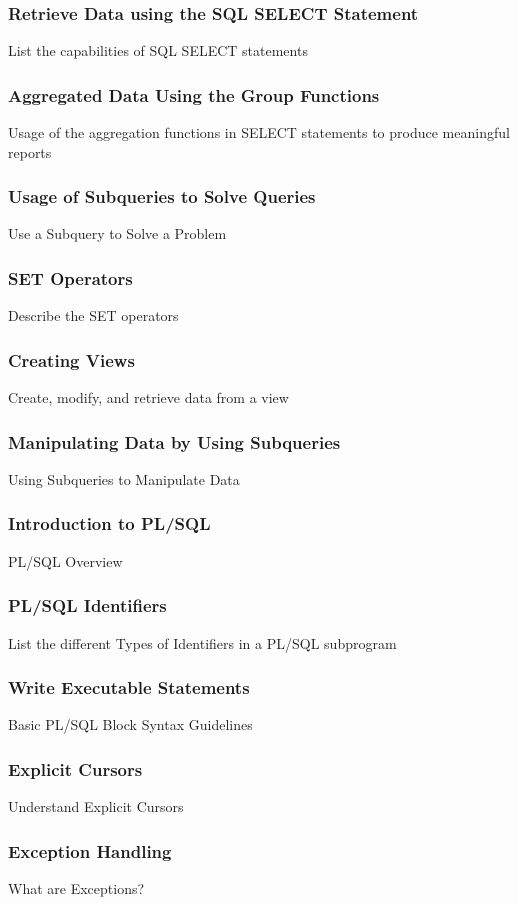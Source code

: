 \documentclass[twocolumn]{article}
\begin{document}
    \subsubsection*{Retrieve Data using the SQL SELECT Statement}
    List the capabilities of SQL SELECT statements
    \subsubsection*{Aggregated Data Using the Group Functions}
    Usage of the aggregation functions in SELECT statements to produce meaningful reports
    \subsubsection*{Usage of Subqueries to Solve Queries}
    Use a Subquery to Solve a Problem
    \subsubsection*{SET Operators}
    Describe the SET operators
    \subsubsection*{Creating Views}
    Create, modify, and retrieve data from a view
    \subsubsection*{Manipulating Data by Using Subqueries}
    Using Subqueries to Manipulate Data
    \subsubsection*{Introduction to PL/SQL}
    PL/SQL Overview
    \subsubsection*{PL/SQL Identifiers}
    List the different Types of Identifiers in a PL/SQL subprogram
    \subsubsection*{Write Executable Statements}
    Basic PL/SQL Block Syntax Guidelines
    \subsubsection*{Explicit Cursors}
    Understand Explicit Cursors
    \subsubsection*{Exception Handling}
    What are Exceptions?
\end{document}
